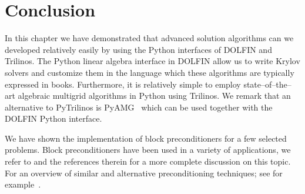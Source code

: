 \section{Conclusion}

In this chapter we have demonstrated that advanced solution algorithms
can we developed relatively easily by using the Python interfaces of
DOLFIN and Trilinos. The Python linear algebra interface in DOLFIN
allow us to write Krylov solvers and customize them in the language
which these algorithms are typically expressed in books.  Furthermore,
it is relatively simple to employ state--of--the--art algebraic
multigrid algorithms in Python using Trilinos.  We remark that an
alternative to PyTrilinos is PyAMG~\citep{BellOlsonSchroder2009} which
can be used together with the DOLFIN Python interface.

We have shown the implementation of block preconditioners for a few
selected problems.  Block preconditioners have been used in a variety
of applications, we refer to \citet{MardalWinther11} and the
references therein for a more complete discussion on this topic.  For
an overview of similar and alternative preconditioning techniques; see
for example~\citet{BenziGolubLiesen2005,ElmanSilvesterWathen2005,Hiptmair2006,Kirby2010}.
